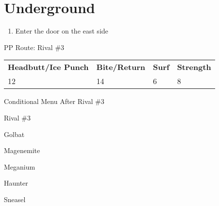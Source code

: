 \chapter{Underground}
\vspace{0.5mm}

\begin{paracol}{2}

\begin{enumerate}
	\item Enter the door on the east side
\end{enumerate}

\switchcolumn*
\alignBoxes
\begin{misc}{PP Route: Rival \#3}
	\varwb
	\begin{tabu} to \textwidth {X[6,c] X[5,c] X[4,c] X[4,c]}
		\textbf{Headbutt/Ice Punch} & \textbf{Bite/Return} & \textbf{Surf} & \textbf{Strength}\\ 
		12 & 14 & 6 & 8
	\end{tabu}
	\varwe
\end{misc}

\begin{menu}{Conditional Menu After Rival \#3}
	\varwb
	\begin{packMenu}
		\item \fullHeal{} 
	\end{packMenu}
	\varwe
\end{menu}

\switchcolumn
\begin{boss}{Rival \#3}
	\varwb
	\begin{fightSection}{Golbat}
		\item {} \icePunch
	\end{fightSection}
	\begin{fightSection}{Magenemite}
		\item {}
		\item {} \surf
	\end{fightSection}
	\begin{fightSection}{Meganium}
		\item {}
		\item {} \icePunch
	\end{fightSection}
	\begin{fightSection}{Haunter}
		\item {} \icePunch
	\end{fightSection}
	\begin{fightSection}{Sneasel}
		\item {} \surf
	\end{fightSection}
	\varwe
\end{boss}


\end{paracol}
